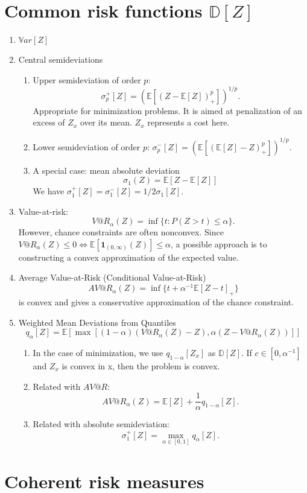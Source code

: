 \documentclass[a4pper,11pt]{article}
\newcommand{\be}{\mathbb E}
\begin{document}
\section{Common risk functions $\mathbb D[Z]$}
\begin{enumerate}
	\item $\mathbb{V}ar [Z]$
	\item Central semideviations
		\begin{enumerate}
			\item Upper semideviation of order $p$: 
			$$\sigma^+_p[Z]=(\be[(Z-\be[Z])^p_+])^{1/p}.$$ 
			Appropriate for minimization problems. It is aimed at penalization of an excess of $Z_x$ over its mean. $Z_x$ represents a cost here.
			\item  Lower semideviation of order $p$: $\sigma^-_p[Z]=(\be[(\be[Z]-Z)^p_+])^{1/p}$.
			\item A special case: mean absolute deviation
			$$\sigma_1(Z)=\be [Z-\be [Z]]$$
			We have $\sigma^+_1[Z]=\sigma^-_1[Z]=1/2\sigma_1[Z]$.
		\end{enumerate}
	\item Value-at-risk: 
			$$V@R_\alpha(Z)=\inf\{t:P(Z>t)\leq \alpha\}.$$
	However, chance constraints are often nonconvex. Since $V@R_\alpha(Z)\leq 0\Leftrightarrow \be[\boldsymbol 1_{(0,\infty)}(Z)]\leq \alpha$, a possible approach is to constructing a convex approximation of the expected value.
	\item Average Value-at-Risk (Conditional Value-at-Risk)
	$$AV@R_\alpha(Z)=\inf\{t+\alpha^{-1}\be[Z-t]_+\}$$
	is convex and gives a conservative approximation of the chance constraint.
	\item Weighted Mean Deviations from Quantiles
		$$q_\alpha[Z]=\be[\max [(1-\alpha)(V@R_\alpha(Z)-Z),\alpha (Z-V@R_\alpha(Z))]]$$
		\begin{enumerate}
			\item In the case of minimization, we use $q_{1-\alpha}[Z_x]$ as $\mathbb D[Z]$.
			If $c\in [0,\alpha^{-1}]$ and $Z_x$ is convex in x, then the problem is convex.
			\item Related with $AV@R$: 
			$$AV@R_\alpha(Z)=\be[Z]+\frac{1}{\alpha}q_{1-\alpha}[Z].$$
			\item Related with absolute semideviation:
			$$\sigma^+_1[Z]=\max_{\alpha\in[0,1]}q_\alpha[Z].$$
		\end{enumerate}
\end{enumerate}
\section{Coherent risk measures}
\end{document}
